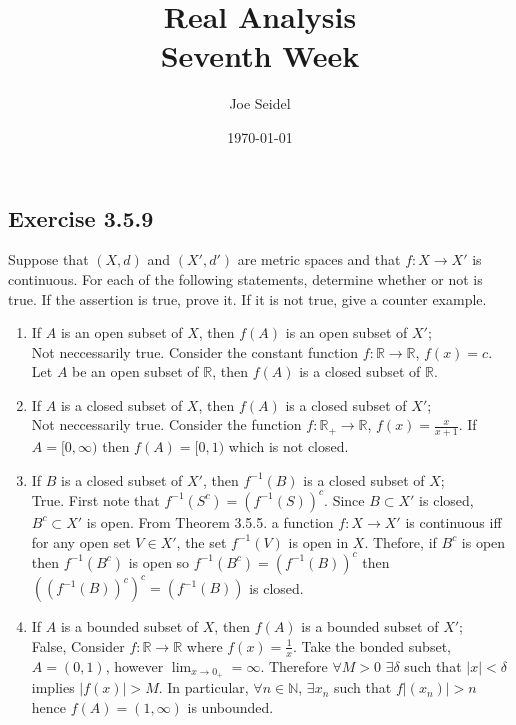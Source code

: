 \documentclass{tufte-book}
\title{Real Analysis\\Seventh Week }
\author{Joe Seidel}
\date{\today}
\theoremstyle{mytheoremstyle}
\theoremstyle{mylemstyle}
\theoremstyle{mydefstyle}
\begin{document}
\maketitle
{}
\newpage
{}

\subsection{Exercise 3.5.9}
Suppose that $(X,d)$ and $(X',d')$ are metric spaces and that $f: X \to X'$ is continuous.  For each of the following statements, determine whether or not is true.  If the assertion is true, prove it.  If it is not true, give a counter example.

\begin{enumerate}

\item If $A$ is an open subset of $X$, then $f(A)$ is an open subset of $X'$;\\
Not neccessarily true.  Consider the constant function $f: \mathbb{R} \to \mathbb{R}$, $f(x) = c$.  Let $A$ be an open subset of $\mathbb{R}$, then $f(A)$ is a closed subset of $\mathbb{R}$.

\item If $A$ is a closed subset of $X$, then $f(A)$ is a closed subset of $X'$;\\
Not neccessarily true.  Consider the function $f: \mathbb{R}_+ \to \mathbb{R}$, $f(x) = \frac{x}{x+1}$.  If $A = [0, \infty)$ then $f(A) = [0,1)$ which is not closed.

\item If $B$ is a closed subset of $X'$, then $f^{-1}(B)$ is a closed subset of $X$;\\
True.  First note that $f^{-1}(S^c) = (f^{-1}(S))^c$.  Since $B \subset X'$ is closed, $B^c \subset X'$ is open.  From Theorem 3.5.5. a function $f: X \to X'$ is continuous iff for any open set $V \in X'$, the set $f^{-1}(V)$ is open in $X$.  Thefore, if $B^c$ is open then $f^{-1}(B^c)$ is open so $f^{-1}(B^c) = (f^{-1}(B))^c$ then $((f^{-1}(B))^c)^c = (f^{-1}(B))$ is closed.

\item If $A$ is a bounded subset of $X$, then $f(A)$ is a bounded subset of $X'$;\\
False,  Consider $f: \mathbb{R} \to \mathbb{R}$ where $f(x) = \frac{1}{x}$.  Take the bonded subset, $A = (0,1)$, however $\lim_{x \to 0_+} = \infty$.  Therefore $\forall M>0$ $\exists \delta$ such that $|x| < \delta$ implies $|f(x)| > M$.  In particular, $\forall n \in \mathbb{N}$, $\exists x_n$ such that $f|(x_n)| > n$ hence $f(A)=(1, \infty)$ is unbounded.


\end{enumerate}
\end{document}
